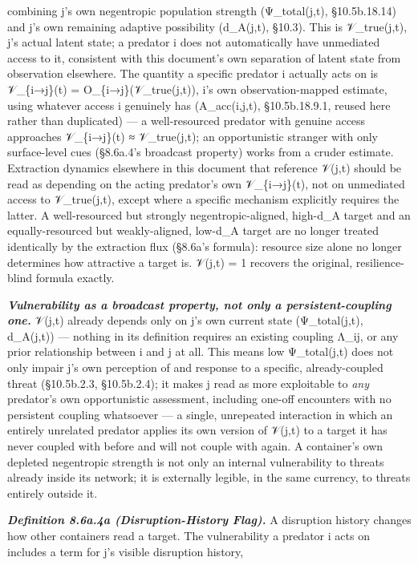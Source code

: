\documentclass[
]{article}
\begin{document}
combining j's own negentropic population strength (Ψ\_total(j,t),
§10.5b.18.14) and j's own remaining adaptive possibility (d\_A(j,t),
§10.3). This is 𝒱\_true(j,t), j's actual latent state; a predator i does
not automatically have unmediated access to it, consistent with this
document's own separation of latent state from observation elsewhere.
The quantity a specific predator i actually acts on is 𝒱\_\{i→j\}(t) =
O\_\{i→j\}(𝒱\_true(j,t)), i's own observation-mapped estimate, using
whatever access i genuinely has (A\_acc(i,j,t), §10.5b.18.9.1, reused
here rather than duplicated) --- a well-resourced predator with genuine
access approaches 𝒱\_\{i→j\}(t) ≈ 𝒱\_true(j,t); an opportunistic
stranger with only surface-level cues (§8.6a.4's broadcast property)
works from a cruder estimate. Extraction dynamics elsewhere in this
document that reference 𝒱(j,t) should be read as depending on the acting
predator's own 𝒱\_\{i→j\}(t), not on unmediated access to 𝒱\_true(j,t),
except where a specific mechanism explicitly requires the latter. A
well-resourced but strongly negentropic-aligned, high-d\_A target and an
equally-resourced but weakly-aligned, low-d\_A target are no longer
treated identically by the extraction flux (§8.6a's formula): resource
size alone no longer determines how attractive a target is. 𝒱(j,t) = 1
recovers the original, resilience-blind formula exactly.

\emph{\textbf{Vulnerability as a broadcast property, not only a
persistent-coupling one.}} 𝒱(j,t) already depends only on j's own
current state (Ψ\_total(j,t), d\_A(j,t)) --- nothing in its definition
requires an existing coupling Λ\_ij, or any prior relationship between i
and j at all. This means low Ψ\_total(j,t) does not only impair j's own
perception of and response to a specific, already-coupled threat
(§10.5b.2.3, §10.5b.2.4); it makes j read as more exploitable to
\emph{any} predator's own opportunistic assessment, including one-off
encounters with no persistent coupling whatsoever --- a single,
unrepeated interaction in which an entirely unrelated predator applies
its own version of 𝒱(j,t) to a target it has never coupled with before
and will not couple with again. A container's own depleted negentropic
strength is not only an internal vulnerability to threats already inside
its network; it is externally legible, in the same currency, to threats
entirely outside it.

\emph{\textbf{Definition 8.6a.4a (Disruption-History Flag).}} A
disruption history changes how other containers read a target. The
vulnerability a predator i acts on includes a term for j's visible
disruption history,
\end{document}
